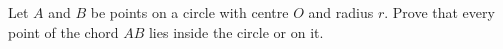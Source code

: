 Let $A$ and $B$ be points on a circle with centre $O$ and radius $r$. Prove that every point of the chord $AB$ lies inside the circle or on it.
